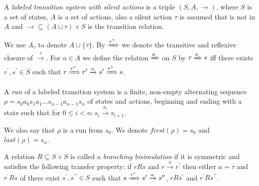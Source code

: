 \begin{definition}
  A {\em labeled transition system with silent actions} is a triple $(S, A, \rightarrow)$, where $S$ is a set of states, $A$ is a set of actions, also a silent action $\tau$ is assumed that is not in $A$ and $\rightarrow\subseteq (A\cup\tau)\times S$ is the transition relation.
\end{definition}

We use $A_\tau$ to denote $A\cup\{\tau\}$.
By $\xRightarrow{\tau^*}$ we denote the transitive and reflexive closure of $\xrightarrow{\tau}$. For $a\in A$ we define the relation $\xRightarrow{a}$ on $S$ by $r\xRightarrow{a}s$ iff there exists $r^\prime, s^\prime\in S$ such that $r \xRightarrow{\tau^*} r^\prime \xrightarrow{a} s^\prime \xRightarrow{\tau^*} s$.

\begin{definition}
  A {\em run} of a labeled transition system is a finite, non-empty alternating sequence $\rho = s_0a_0s_1a_1\ldots s_{n-1}a_{n-1}s_n$ of states and actions, beginning and ending with a state such that for $0\leq i<n: s_i\xrightarrow{a_i}s_{i+1}$.
\end{definition}

We also say that $\rho$ is a run from $s_0$. We denote $first(\rho)=s_0$ and $last(\rho)=s_n$.

\begin{definition}
  A relation $R\subseteq S\times S$ is called a {\em branching bisimulation} if it is symmetric and satisfies the following transfer property: if $rRs$ and $r\xrightarrow{a} r^\prime$ then either $a=\tau$ and $r^\prime Rs$ of there exist $s^\prime,s^{\prime\prime}\in S$ such that $s \xRightarrow{\tau^*} s^\prime \xrightarrow{a} s^{\prime\prime}$, $rRs^\prime$ and $r^\prime Rs^{\prime\prime}$.
\end{definition}

